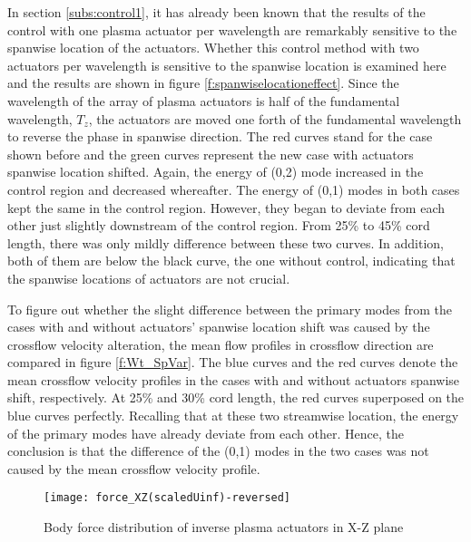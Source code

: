 \documentclass{AIAA}
\begin{document}
In section \ref{subs:control1}, it has already been known that the results of the control with one plasma actuator per wavelength are remarkably sensitive to the spanwise location of the actuators. Whether this control method with two actuators per wavelength is sensitive to the spanwise location is examined here and the results are shown in figure \ref{f:spanwiselocationeffect}. Since the wavelength of the array of plasma actuators is half of the fundamental wavelength, $T_z$, the actuators are moved one forth of the fundamental wavelength to reverse the phase in spanwise direction. The red curves stand for the case shown before and the green curves represent the new case with actuators spanwise location shifted. Again, the energy of (0,2) mode increased in the control region and decreased whereafter. The energy of (0,1) modes in both cases kept the same in the control region. However, they began to deviate from each other just slightly downstream of the control region. From 25\% to 45\% cord length, there was only mildly difference between these two curves. In addition, both of them are below the black curve, the one without control, indicating that the spanwise locations of actuators are not crucial.

To figure out whether the slight difference between the primary modes from the cases with and without actuators' spanwise location shift was caused by the crossflow velocity alteration, the mean flow profiles in crossflow direction are compared in figure \ref{f:Wt_SpVar}. The blue curves and the red curves denote the mean crossflow velocity profiles in the cases with and without actuators spanwise shift, respectively. At 25\% and 30\% cord length, the red curves superposed on the blue curves perfectly. Recalling that at these two streamwise location, the energy of the primary modes have already deviate from each other. Hence, the conclusion is that the difference of the (0,1) modes in the two cases was not caused by the mean crossflow velocity profile.
\begin{figure}
\centering
\texttt{[image: force\_XZ(scaledUinf)-reversed]}
\caption{Body force distribution of inverse plasma actuators in X-Z plane}%
\label{f:force_reversed}
\end{figure}
\end{document}
